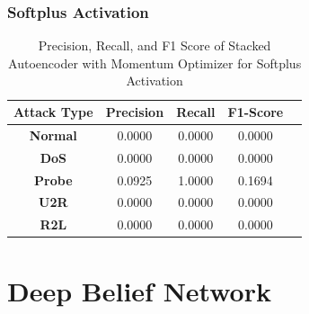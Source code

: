 \documentclass[12pt, a4paper]{report}
\begin{document}
\subsubsection{Softplus Activation}
\begin{table}[ht]
\centering
\captionsetup{justification=centering,margin=2cm}
\begin{tabular}{|c|c|c|c|c|}
\hline
\multicolumn{1}{|c|}{\textbf{Attack Type}} & \multicolumn{1}{c|}{\textbf{Precision}} & \multicolumn{1}{c|}{\textbf{Recall}} & \multicolumn{1}{c|}{\textbf{F1-Score}} \\ \hline
\textbf{Normal}        & 0.0000                                   & 0.0000                                & 0.0000                                                                  \\ \hline
\textbf{DoS}           & 0.0000                                  & 0.0000                                &  0.0000                                                                    \\ \hline
\textbf{Probe}         & 0.0925                                  & 1.0000                                & 0.1694                                                                  \\ \hline
\textbf{U2R}           & 0.0000                                    & 0.0000                                & 0.0000                                                                   \\ \hline
\textbf{R2L}           & 0.0000                                      & 0.0000                                   & 0.0000                                                            \\ \hline         \end{tabular}
\caption{Precision, Recall, and F1 Score of Stacked Autoencoder with Momentum Optimizer for Softplus Activation}
\label{prf1_mom_elu_auto}
\end{table}


\clearpage


\section{Deep Belief Network}\label{sec:dbn_eval}
\end{document}
